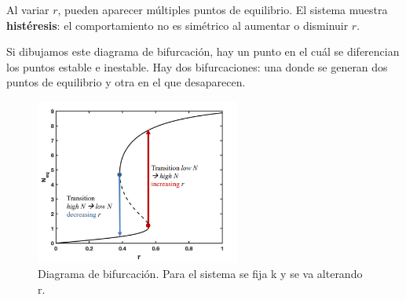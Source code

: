 Al variar $r$, pueden aparecer múltiples puntos de equilibrio. El sistema muestra \textbf{histéresis}: el comportamiento no es simétrico al aumentar o disminuir $r$.

\newpage

Si dibujamos este diagrama de bifurcación, hay un punto en el cuál se diferencian los puntos estable e inestable. Hay dos bifurcaciones: una donde se generan dos puntos de equilibrio y otra en el que desaparecen.

\begin{figure}[h]
\centering
\includegraphics[width = 0.6\textwidth]{figs/bifurcation-diagram-log.png}
\caption{Diagrama de bifurcación. Para el sistema se fija k y se va alterando r. }
\end{figure}

